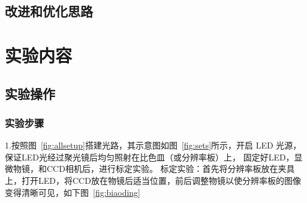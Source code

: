 \documentclass[a4paper]{report} %
\begin{document}
\section{改进和优化思路}

\chapter{实验内容}

\section{实验操作}
\subsection{实验步骤}
1.按照图~\ref{fig:allsetup}搭建光路，其示意图如图~\ref{fig:sets}所示，开启 LED 光源，保证LED光经过聚光镜后均匀照射在比色皿（或分辨率板）上，
固定好LED，显微物镜，和CCD相机后，进行标定实验。
标定实验：首先将分辨率板放在夹具上，打开LED，将CCD放在物镜后适当位置，前后调整物镜以使分辨率板的图像变得清晰可见，如下图~\ref{fig:biaoding}
\end{document}
